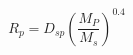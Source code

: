\begin{equation*}
R_{p} = D_{sp} \left( \frac{M_{P}}{M_{s}} \right)^{0.4} \tag{4.89}
\end{equation*}
